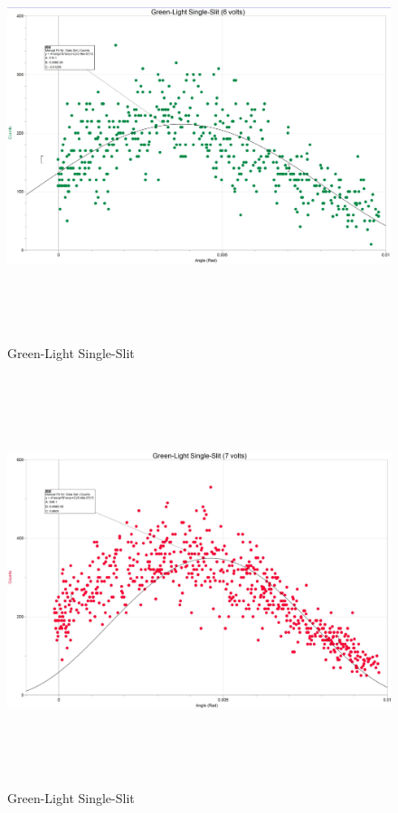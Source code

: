 \documentclass[fleqn]{article}
\begin{document}
  \pagebreak

  \begin{figure}[h!]
    \includegraphics[height=12cm, width=18cm]{Fig4A.JPG}
    \caption{
      Green-Light Single-Slit
    }
  \end{figure}

  \pagebreak

  \begin{figure}[h!]
    \includegraphics[height=12cm, width=18cm]{Fig4B.JPG}
    \caption{
      Green-Light Single-Slit
    }
  \end{figure}
\end{document}
